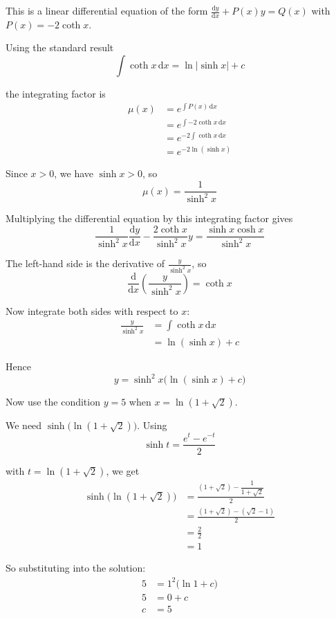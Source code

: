 \documentclass[leqno]{article}
\begin{document}
\begin{enumerate}[
  label=\textbf{\arabic*.},
  leftmargin=*,
  topsep=0pt,
  partopsep=0pt,
  parsep=0pt
]
\begin{djsSolution}
This is a linear differential equation of the form \(\frac{\mathrm{d}y}{\mathrm{d}x}+P(x)y=Q(x)\) with \(P(x)=-2\coth x\).

Using the standard result
\[
\int \coth x\,\mathrm{d}x=\ln|\sinh x|+c
\]

the integrating factor is
\begin{align*}
\mu(x) &= e^{\int P(x)\,\mathrm{d}x} \\
&= e^{\int -2\coth x\,\mathrm{d}x} \\
&= e^{-2\int \coth x\,\mathrm{d}x} \\
&= e^{-2\ln(\sinh x)}
\end{align*}

Since $x>0$, we have $\sinh x>0$, so
\[
\mu(x)=\frac{1}{\sinh^2 x}
\]

Multiplying the differential equation by this integrating factor gives
\[
\frac{1}{\sinh^2 x}\frac{\mathrm{d}y}{\mathrm{d}x} - \frac{2\coth x}{\sinh^2 x}y = \frac{\sinh x\cosh x}{\sinh^2 x}
\]

The left-hand side is the derivative of $\frac{y}{\sinh^2 x}$, so
\[
\frac{\mathrm{d}}{\mathrm{d}x}\left(\frac{y}{\sinh^2 x}\right)=\coth x
\]

Now integrate both sides with respect to $x$:
\begin{align*}
\frac{y}{\sinh^2 x} &= \int \coth x\,\mathrm{d}x \\
&= \ln(\sinh x) + c
\end{align*}

Hence
\[
y=\sinh^2 x\bigl(\ln(\sinh x)+c\bigr)
\]

Now use the condition $y=5$ when $x=\ln(1+\sqrt{2})$.

We need $\sinh\!\bigl(\ln(1+\sqrt{2})\bigr)$. Using
\[
\sinh t=\frac{e^t-e^{-t}}{2}
\]

with $t=\ln(1+\sqrt{2})$, we get
\begin{align*}
\sinh\!\bigl(\ln(1+\sqrt{2})\bigr)
&= \frac{(1+\sqrt{2})-\dfrac{1}{1+\sqrt{2}}}{2} \\
&= \frac{(1+\sqrt{2})-(\sqrt{2}-1)}{2} \\
&= \frac{2}{2} \\
&= 1
\end{align*}

So substituting into the solution:
\begin{align*}
5 &= 1^2\bigl(\ln 1 + c\bigr) \\
5 &= 0 + c \\
c &= 5
\end{align*}


\end{djsSolution}
\end{enumerate}
\end{document}
